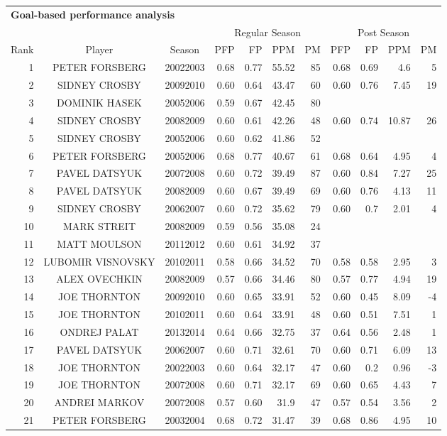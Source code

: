 \begin{table}[p]
        \centering\small
        \begin{tabular}{r c c |r r r r |r r r r }
        \multicolumn{9}{l}{\bf Goal-based performance analysis}\\
            & & & \multicolumn{4}{|c}{Regular Season} & \multicolumn{4}{|c}{Post Season}\\
            Rank & Player & Season  & PFP & FP & PPM & PM & PFP & FP & PPM & PM  \\ \hline
            \rule{0pt}{4ex} 
1&PETER FORSBERG&20022003&0.68&0.77&55.52&85&0.68&0.69&4.6&5\\
2&SIDNEY CROSBY&20092010&0.60&0.64&43.47&60&0.60&0.76&7.45&19\\
3&DOMINIK HASEK&20052006&0.59&0.67&42.45&80&&&&\\
4&SIDNEY CROSBY&20082009&0.60&0.61&42.26&48&0.60&0.74&10.87&26\\
5&SIDNEY CROSBY&20052006&0.60&0.62&41.86&52&&&&\\
6&PETER FORSBERG&20052006&0.68&0.77&40.67&61&0.68&0.64&4.95&4\\
7&PAVEL DATSYUK&20072008&0.60&0.72&39.49&87&0.60&0.84&7.27&25\\
8&PAVEL DATSYUK&20082009&0.60&0.67&39.49&69&0.60&0.76&4.13&11\\
9&SIDNEY CROSBY&20062007&0.60&0.72&35.62&79&0.60&0.7&2.01&4\\
10&MARK STREIT&20082009&0.59&0.56&35.08&24&&&&\\
11&MATT MOULSON&20112012&0.60&0.61&34.92&37&&&&\\
12&LUBOMIR VISNOVSKY&20102011&0.58&0.66&34.52&70&0.58&0.58&2.95&3\\
13&ALEX OVECHKIN&20082009&0.57&0.66&34.46&80&0.57&0.77&4.94&19\\
14&JOE THORNTON&20092010&0.60&0.65&33.91&52&0.60&0.45&8.09&-4\\
15&JOE THORNTON&20102011&0.60&0.64&33.91&48&0.60&0.51&7.51&1\\
16&ONDREJ PALAT&20132014&0.64&0.66&32.75&37&0.64&0.56&2.48&1\\
17&PAVEL DATSYUK&20062007&0.60&0.71&32.61&70&0.60&0.71&6.09&13\\
18&JOE THORNTON&20022003&0.60&0.64&32.17&47&0.60&0.2&0.96&-3\\
19&JOE THORNTON&20072008&0.60&0.71&32.17&69&0.60&0.65&4.43&7\\
20&ANDREI MARKOV&20072008&0.57&0.60&31.9&47&0.57&0.54&3.56&2\\
21&PETER FORSBERG&20032004&0.68&0.72&31.47&39&0.68&0.86&4.95&10\\

\end{tabular}
\end{table}
